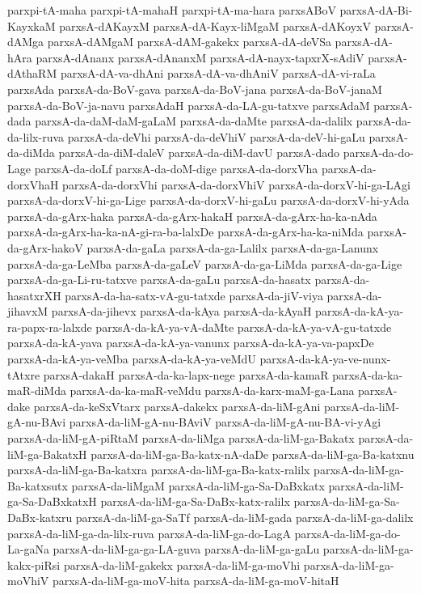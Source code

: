 {parxpi-tA-maha
parxpi-tA-mahaH
parxpi-tA-ma-hara
parxsABoV
parxsA-dA-Bi-KayxkaM
parxsA-dAKayxM
parxsA-dA-Kayx-liMgaM
parxsA-dAKoyxV
parxsA-dAMga
parxsA-dAMgaM
parxsA-dAM-gakekx
parxsA-dA-deVSa
parxsA-dA-hAra
parxsA-dAnanx
parxsA-dAnanxM
parxsA-dA-nayx-tapxrX-sAdiV
parxsA-dAthaRM
parxsA-dA-va-dhAni
parxsA-dA-va-dhAniV
parxsA-dA-vi-raLa
parxsAda
parxsA-da-BoV-gava
parxsA-da-BoV-jana
parxsA-da-BoV-janaM
parxsA-da-BoV-ja-navu
parxsAdaH
parxsA-da-LA-gu-tatxve
parxsAdaM
parxsA-dada
parxsA-da-daM-daM-gaLaM
parxsA-da-daMte
parxsA-da-dalilx
parxsA-da-da-lilx-ruva
parxsA-da-deVhi
parxsA-da-deVhiV
parxsA-da-deV-hi-gaLu
parxsA-da-diMda
parxsA-da-diM-daleV
parxsA-da-diM-davU
parxsA-dado
parxsA-da-do-Lage
parxsA-da-doLf
parxsA-da-doM-dige
parxsA-da-dorxVha
parxsA-da-dorxVhaH
parxsA-da-dorxVhi
parxsA-da-dorxVhiV
parxsA-da-dorxV-hi-ga-LAgi
parxsA-da-dorxV-hi-ga-Lige
parxsA-da-dorxV-hi-gaLu
parxsA-da-dorxV-hi-yAda
parxsA-da-gArx-haka
parxsA-da-gArx-hakaH
parxsA-da-gArx-ha-ka-nAda
parxsA-da-gArx-ha-ka-nA-gi-ra-ba-lalxDe
parxsA-da-gArx-ha-ka-niMda
parxsA-da-gArx-hakoV
parxsA-da-gaLa
parxsA-da-ga-Lalilx
parxsA-da-ga-Lanunx
parxsA-da-ga-LeMba
parxsA-da-gaLeV
parxsA-da-ga-LiMda
parxsA-da-ga-Lige
parxsA-da-ga-Li-ru-tatxve
parxsA-da-gaLu
parxsA-da-hasatx
parxsA-da-hasatxrXH
parxsA-da-ha-satx-vA-gu-tatxde
parxsA-da-jiV-viya
parxsA-da-jihavxM
parxsA-da-jihevx
parxsA-da-kAya
parxsA-da-kAyaH
parxsA-da-kA-ya-ra-papx-ra-lalxde
parxsA-da-kA-ya-vA-daMte
parxsA-da-kA-ya-vA-gu-tatxde
parxsA-da-kA-yava
parxsA-da-kA-ya-vanunx
parxsA-da-kA-ya-va-papxDe
parxsA-da-kA-ya-veMba
parxsA-da-kA-ya-veMdU
parxsA-da-kA-ya-ve-nunx-tAtxre
parxsA-dakaH
parxsA-da-ka-lapx-nege
parxsA-da-kamaR
parxsA-da-ka-maR-diMda
parxsA-da-ka-maR-veMdu
parxsA-da-karx-maM-ga-Lana
parxsA-dake
parxsA-da-keSxVtarx
parxsA-dakekx
parxsA-da-liM-gAni
parxsA-da-liM-gA-nu-BAvi
parxsA-da-liM-gA-nu-BAviV
parxsA-da-liM-gA-nu-BA-vi-yAgi
parxsA-da-liM-gA-piRtaM
parxsA-da-liMga
parxsA-da-liM-ga-Bakatx
parxsA-da-liM-ga-BakatxH
parxsA-da-liM-ga-Ba-katx-nA-daDe
parxsA-da-liM-ga-Ba-katxnu
parxsA-da-liM-ga-Ba-katxra
parxsA-da-liM-ga-Ba-katx-ralilx
parxsA-da-liM-ga-Ba-katxsutx
parxsA-da-liMgaM
parxsA-da-liM-ga-Sa-DaBxkatx
parxsA-da-liM-ga-Sa-DaBxkatxH
parxsA-da-liM-ga-Sa-DaBx-katx-ralilx
parxsA-da-liM-ga-Sa-DaBx-katxru
parxsA-da-liM-ga-SaTf
parxsA-da-liM-gada
parxsA-da-liM-ga-dalilx
parxsA-da-liM-ga-da-lilx-ruva
parxsA-da-liM-ga-do-LagA
parxsA-da-liM-ga-do-La-gaNa
parxsA-da-liM-ga-ga-LA-guva
parxsA-da-liM-ga-gaLu
parxsA-da-liM-ga-kakx-piRsi
parxsA-da-liM-gakekx
parxsA-da-liM-ga-moVhi
parxsA-da-liM-ga-moVhiV
parxsA-da-liM-ga-moV-hita
parxsA-da-liM-ga-moV-hitaH
}
